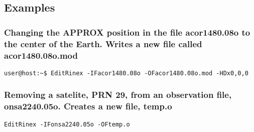 \subsection{Examples}
\subsubsection{Changing the APPROX position in the file acor1480.08o to the center of the Earth. Writes a new file called acor1480.08o.mod}
\begin{verbatim}
user@host:~$ EditRinex -IFacor1480.08o -OFacor1480.08o.mod -HDx0,0,0 
\end{verbatim}

\subsubsection{Removing a satelite, PRN 29, from an observation file, onsa2240.05o. Creates a new file, temp.o}
\begin{verbatim}
EditRinex -IFonsa2240.05o -OFtemp.o 
\end{verbatim}
%

